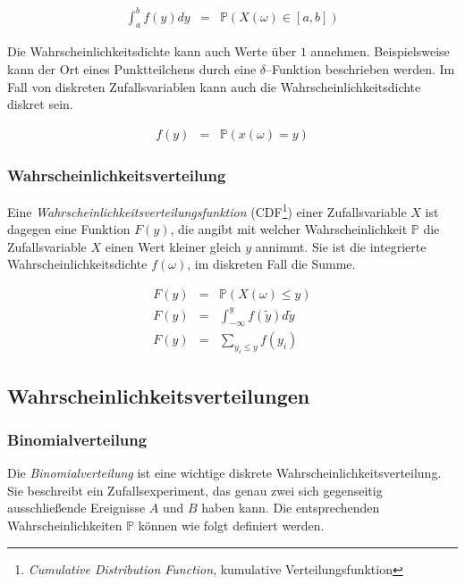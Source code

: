 \documentclass[12pt,a4paper]{scrartcl}
\numberwithin{equation}{section} %
\begin{document}
\begin{eqnarray}
	\int_{a}^{b} f(y) dy &=& \mathbb P(X(\omega) \in [a,b])
		\label{eq:wahrscheinlichkeitsdichte}
\end{eqnarray}

\noindent
Die Wahrscheinlichkeitsdichte kann auch Werte über $1$ annehmen. Beispielsweise kann der Ort eines Punktteilchens durch eine $\delta$--Funktion beschrieben werden. Im Fall von diskreten Zufallsvariablen kann auch die Wahrscheinlichkeitsdichte diskret sein.

\begin{eqnarray}
	f(y) &=& \mathbb P\left(x(\omega) = y\right)
\end{eqnarray}

\subsubsection{Wahrscheinlichkeitsverteilung}
\label{Wahrscheinlichkeitsverteilung}
Eine \emph{Wahrscheinlichkeitsverteilungsfunktion} (CDF\footnote{\emph{Cumulative Distribution Function}, kumulative Verteilungsfunktion}) einer Zufallsvariable $X$ ist dagegen eine Funktion $F(y)$, die angibt mit welcher Wahrscheinlichkeit $\mathbb P$ die Zufallsvariable $X$ einen Wert kleiner gleich $y$ annimmt. Sie ist die integrierte Wahrscheinlichkeitsdichte $f(\omega)$, im diskreten Fall die Summe.

\begin{eqnarray}
	F(y) &=& \mathbb P(X(\omega) \leq y) \\
	F(y) &=& \int_{- \infty}^{y} f(\tilde{y}) d\tilde{y} \\
	F(y) &=& \sum_{y_i \leq y}^{} f(y_i)
\end{eqnarray}

\subsection{Wahrscheinlichkeitsverteilungen}
\label{Wahrscheinlichkeitsverteilungen}

\subsubsection{Binomialverteilung}
\label{Binomialverteilung}
Die \emph{Binomialverteilung} ist eine wichtige diskrete Wahrscheinlichkeitsverteilung. Sie beschreibt ein Zufallsexperiment, das genau zwei sich gegenseitig ausschließende Ereignisse $A$ und $B$ haben kann. Die entsprechenden Wahrscheinlichkeiten $\mathbb P$ können wie folgt definiert werden.
\end{document}

